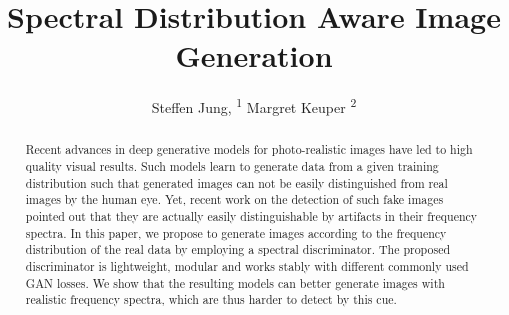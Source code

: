 \documentclass[letterpaper]{article} %
\title{Spectral Distribution Aware Image Generation}
\author{
    Steffen Jung, \textsuperscript{\rm 1}
    Margret Keuper \textsuperscript{\rm 2}
    \\
}
\begin{document}



%
%
%
%
%
%
\maketitle              %
%
\begin{abstract}
Recent advances in deep generative models for photo-realistic images have led to high quality visual results. Such models learn to generate data from a given training distribution such that generated images can not be easily distinguished from real images by the human eye. Yet, recent work on the detection of such fake images pointed out that they are actually easily distinguishable by artifacts in their frequency spectra. In this paper, we propose to generate images according to the frequency distribution of the real data by employing a spectral discriminator. The proposed discriminator is lightweight, modular and works stably with different commonly used GAN losses. We show that the resulting models can better generate images with realistic frequency spectra, which are thus harder to detect by this cue.

\end{abstract}
%
%
%
\end{document}
